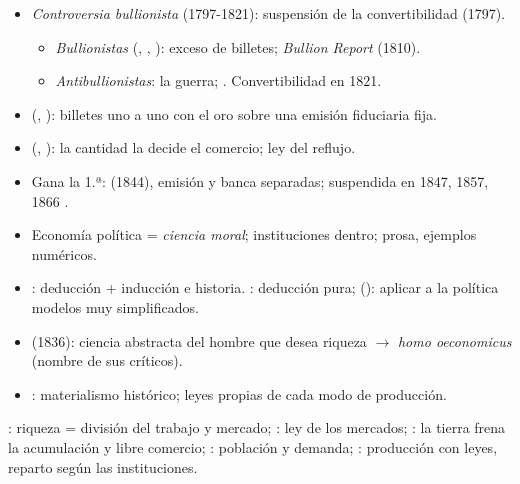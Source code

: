 \documentclass{article}
\begin{document}
\begin{columnas}
\begin{itemize}
\item \emph{Controversia bullionista} (1797-1821): suspensión de la convertibilidad (1797).
  \begin{itemize}
  \item \emph{Bullionistas} (, , ): exceso de billetes; \emph{Bullion Report} (1810).
  \item \emph{Antibullionistas}: la guerra; . Convertibilidad en 1821.
  \end{itemize}
\item {} (, ): billetes uno a uno con el oro sobre una emisión fiduciaria fija.
\item {} (, ): la cantidad la decide el comercio; ley del reflujo.
\item Gana la 1.ª:  (1844), emisión y banca separadas; suspendida en 1847, 1857, 1866 .
\end{itemize}

\begin{itemize}
\item Economía política = \emph{ciencia moral}; instituciones dentro; prosa, ejemplos numéricos.
\item {}: deducción + inducción e historia. : deducción pura;  (): aplicar a la política modelos muy simplificados.
\item {} (1836): ciencia abstracta del hombre que desea riqueza $\to$ \emph{homo oeconomicus} (nombre de sus críticos).
\item {}: materialismo histórico; leyes propias de cada modo de producción.
\end{itemize}

\begin{ideaclave}
: riqueza = división del trabajo y mercado; : ley de los mercados; : la tierra frena la acumulación y libre comercio; : población y demanda; : producción con leyes, reparto según las instituciones.
\end{ideaclave}


\end{columnas}
\end{document}
